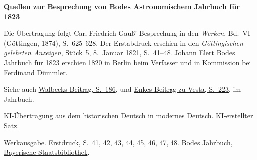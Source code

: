 \clearpage\thispagestyle{empty}
\begin{center}\Large\bfseries Quellen zur Besprechung von Bodes Astronomischem Jahrbuch für 1823\end{center}

Die Übertragung folgt Carl Friedrich Gauß’ Besprechung in den \emph{Werken}, Bd.~VI (Göttingen, 1874), S.~625--628. Der Erstabdruck erschien in den \emph{Göttingischen gelehrten Anzeigen}, Stück~5, 8.~Januar 1821, S.~41--48. Johann Elert Bodes Jahrbuch für 1823 erschien 1820 in Berlin beim Verfasser und in Kommission bei Ferdinand Dümmler.

Siehe auch \href{https://api.digitale-sammlungen.de/iiif/image/v2/bsb10538352_00192/full/1650,/0/default.jpg}{Walbecks Beitrag, S.~186}, und \href{https://api.digitale-sammlungen.de/iiif/image/v2/bsb10538352_00229/full/1650,/0/default.jpg}{Enkes Beitrag zu Vesta, S.~223}, im Jahrbuch.

KI-Übertragung aus dem historischen Deutsch in modernes Deutsch. KI-erstellter Satz.

\href{https://gdz.sub.uni-goettingen.de/id/PPN236007467}{Werkausgabe}. Erstdruck, S.~\href{https://images.p.sub.uni-goettingen.de/iiif/image/gdz:PPN319721507_1821:00000043/full/1650,/0/default.jpg}{41}, \href{https://images.p.sub.uni-goettingen.de/iiif/image/gdz:PPN319721507_1821:00000044/full/1650,/0/default.jpg}{42}, \href{https://images.p.sub.uni-goettingen.de/iiif/image/gdz:PPN319721507_1821:00000045/full/1650,/0/default.jpg}{43}, \href{https://images.p.sub.uni-goettingen.de/iiif/image/gdz:PPN319721507_1821:00000046/full/1650,/0/default.jpg}{44}, \href{https://images.p.sub.uni-goettingen.de/iiif/image/gdz:PPN319721507_1821:00000047/full/1650,/0/default.jpg}{45}, \href{https://images.p.sub.uni-goettingen.de/iiif/image/gdz:PPN319721507_1821:00000048/full/1650,/0/default.jpg}{46}, \href{https://images.p.sub.uni-goettingen.de/iiif/image/gdz:PPN319721507_1821:00000049/full/1650,/0/default.jpg}{47}, \href{https://images.p.sub.uni-goettingen.de/iiif/image/gdz:PPN319721507_1821:00000050/full/1650,/0/default.jpg}{48}. \href{https://api.digitale-sammlungen.de/iiif/image/v2/bsb10538352_00003/full/1650,/0/default.jpg}{Bodes Jahrbuch, Bayerische Staatsbibliothek}.

\clearpage
